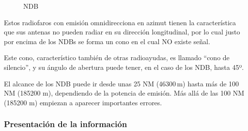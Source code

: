 \begin{figure}[!h]
  \centering
	\hspace{20pt}
  \caption{NDB}
\end{figure}


Estos radiofaros con emisi\'on omnidirecciona en azimut tienen la caracter\'istica que sus antenas no pueden radiar en su direcci\'on longitudinal, por lo cual justo por encima de los NDBs se forma un cono en el cual NO existe se\~nal.

Este cono, caracter\'istico tambi\'en de otras radioayudas, es llamado ``cono de silencio'', y su \'angulo de abertura puede tener, en el caso de los NDB, hasta 45º.

El alcance de los NDB puede ir desde unas 25 NM (46300\,m) hasta m\'as de 100 NM (185200 m), dependiendo de la potencia de emisi\'on. M\'as all\'a de las 100 NM (185200 m) empiezan a aparecer importantes errores.


  \subsubsection{Presentaci\'on de la informaci\'on}
  \label{sec:06.adf.presentacion.informacion}


